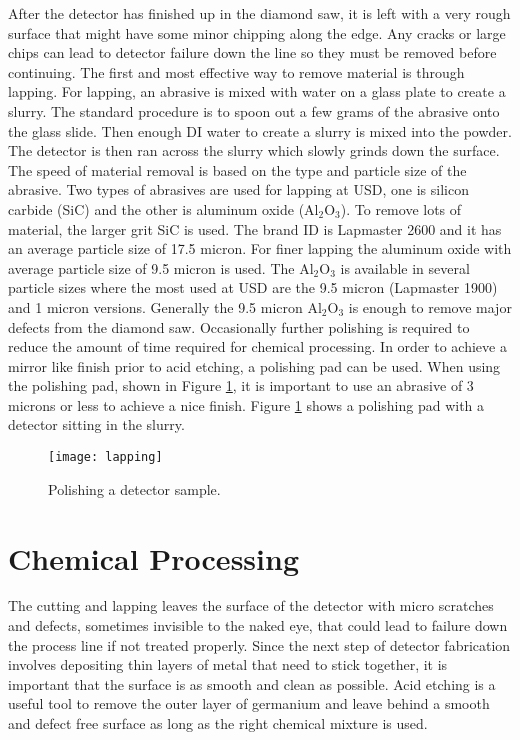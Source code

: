 After the detector has finished up in the diamond saw, it is left with a very rough surface that might have some minor chipping along the edge.
Any cracks or large chips can lead to detector failure down the line so they must be removed before continuing.
The first and most effective way to remove material is through lapping.
For lapping, an abrasive is mixed with water on a glass plate to create a slurry.
The standard procedure is to spoon out a few grams of the abrasive onto the glass slide.
Then enough DI water to create a slurry is mixed into the powder.
The detector is then ran across the slurry which slowly grinds down the surface.
The speed of material removal is based on the type and particle size of the abrasive.
Two types of abrasives are used for lapping at USD, one is silicon carbide (SiC) and the other is aluminum oxide (Al$_2$O$_3$).
To remove lots of material, the larger grit SiC is used.
The brand ID is Lapmaster 2600 and it has an average particle size of 17.5 micron.
For finer lapping the aluminum oxide with average particle size of 9.5 micron is used.
The Al$_2$O$_3$ is available in several particle sizes where the most used at USD are the 9.5 micron (Lapmaster 1900) and 1 micron versions.
Generally the 9.5 micron Al$_2$O$_3$ is enough to remove major defects from the diamond saw.
Occasionally further polishing is required to reduce the amount of time required for chemical processing.
In order to achieve a mirror like finish prior to acid etching, a polishing pad can be used.
When using the polishing pad, shown in Figure \ref{fig:lapping}, it is important to use an abrasive of 3 microns or less to achieve a nice finish.
Figure \ref{fig:lapping} shows a polishing pad with a detector sitting in the slurry.
\begin{figure}[htpb]
\centering
\texttt{[image: lapping]}
\caption{Polishing a detector sample.}
\label{fig:lapping}
\end{figure}

\section{Chemical Processing}

The cutting and lapping leaves the surface of the detector with micro scratches and defects, sometimes invisible to the naked eye, that could lead to failure down the process line if not treated properly.
Since the next step of detector fabrication involves depositing thin layers of metal that need to stick together, it is important that the surface is as smooth and clean as possible.
Acid etching is a useful tool to remove the outer layer of germanium and leave behind a smooth and defect free surface as long as the right chemical mixture is used.  

